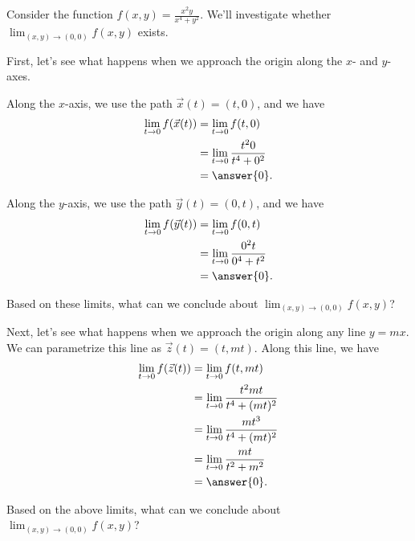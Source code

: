 \documentclass{ximera}
\begin{document}
\begin{example}
Consider the function $f(x,y) = \frac{x^2y}{x^4+y^2}$. We'll investigate whether $\lim_{(x,y)\rightarrow (0,0)}f(x,y)$ exists.

First, let's see what happens when we approach the origin along the $x$- and $y$-axes.

Along the $x$-axis, we use the path $\vec{x}(t) = (t,0)$, and we have
\begin{align*}
\lim_{t\rightarrow 0}f(\vec{x}(t)) &= \lim_{t\rightarrow 0}f(t,0)\\
&= \lim_{t\rightarrow 0}\frac{t^2 0}{t^4+0^2}\\
&= \answer{0}.\\
\end{align*}

Along the $y$-axis, we use the path $\vec{y}(t) = (0,t)$, and we have
\begin{align*}
\lim_{t\rightarrow 0}f(\vec{y}(t)) &= \lim_{t\rightarrow 0}f(0,t)\\
&= \lim_{t\rightarrow 0}\frac{0^2 t}{0^4+t^2}\\
&= \answer{0}.
\end{align*}

Based on these limits, what can we conclude about $\lim_{(x,y)\rightarrow (0,0)}f(x,y)$?
\begin{multipleChoice}
\end{multipleChoice}

Next, let's see what happens when we approach the origin along any line $y=mx$. We can parametrize this line as $\vec{z}(t) = (t, mt)$. Along this line, we have
\begin{align*}
\lim_{t\rightarrow 0}f(\vec{z}(t)) &= \lim_{t\rightarrow 0}f(t,mt)\\
&= \lim_{t\rightarrow 0}\frac{t^2 mt}{t^4+(mt)^2}\\
&= \lim_{t\rightarrow 0}\frac{mt^3}{t^4+(mt)^2}\\
&= \lim_{t\rightarrow 0}\frac{mt}{t^2+m^2}\\
&= \answer{0}.
\end{align*}

Based on the above limits, what can we conclude about $\lim_{(x,y)\rightarrow (0,0)}f(x,y)$?
\begin{multipleChoice}
\end{multipleChoice}


\end{example}
\end{document}
